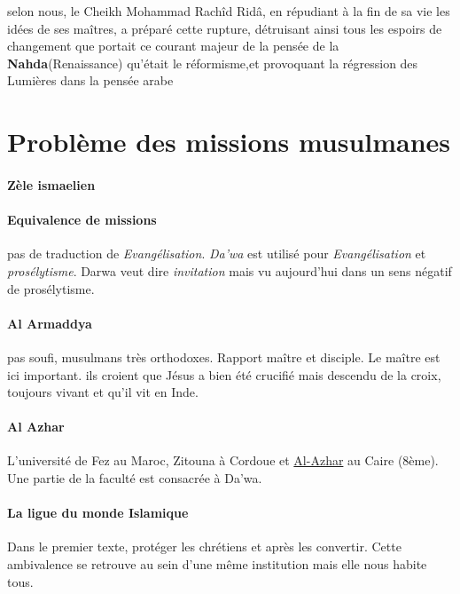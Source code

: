 selon nous, le Cheikh Mohammad Rachîd Ridâ, en répudiant à  la  fin  de  sa  vie  les  idées  de  ses  maîtres,  a  préparé  cette  rupture, détruisant ainsi tous les espoirs de changement que portait ce courant majeur de la pensée de la \textbf{Nahda}(Renaissance) qu’était le réformisme,et provoquant la régression des Lumières dans la pensée arabe

\section{Problème des missions musulmanes}

\paragraph{Zèle ismaelien}

\paragraph{Equivalence de missions} pas de traduction de \textit{Evangélisation}. \textit{Da'wa} est utilisé pour \textit{Evangélisation} et \textit{prosélytisme}. Darwa veut dire \textit{invitation} mais vu aujourd'hui dans un sens négatif de prosélytisme. 

\paragraph{Al Armaddya} pas soufi, musulmans très orthodoxes. Rapport maître et disciple. Le maître est ici important. ils croient que Jésus a bien été crucifié mais descendu de la croix, toujours vivant et qu'il vit en Inde. 

\paragraph{Al Azhar} L'université de Fez au Maroc, Zitouna à Cordoue et \href{http://www.azhar.edu.eg/Graduate-Studies}{Al-Azhar} au Caire (8ème). Une partie de la faculté est consacrée à Da'wa. 

\paragraph{La ligue du monde Islamique} Dans le premier texte, protéger les chrétiens et après les convertir. Cette ambivalence se retrouve au sein d'une même institution mais elle nous habite tous. 


